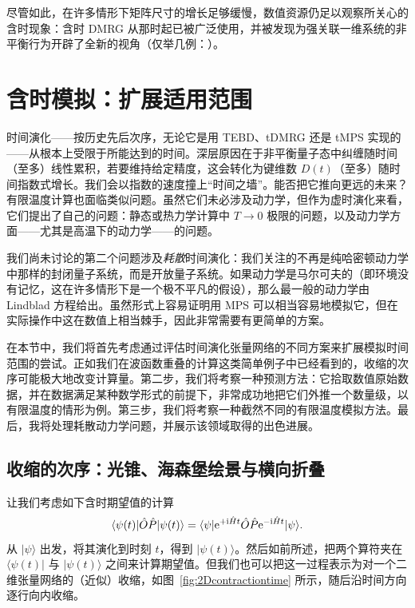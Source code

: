 \documentclass[a4paper,10pt,oneside,onecolumn,1p,times]{elsarticle}
\newcommand{\eul}{{\rm e }}
\newcommand{\imag}{{\rm i }}
\newcommand{\bra}[1]{\mbox{$\langle #1  |$}}
\newcommand{\ket}[1]{\mbox{$| #1  \rangle$}}
\begin{document}
尽管如此，在许多情形下矩阵尺寸的增长足够缓慢，数值资源仍足以观察所关心的含时现象：含时 DMRG 从那时起已被广泛使用，并被发现为强关联一维系统的非平衡行为开辟了全新的视角（仅举几例：\cite{WhiteFeiguin04,Feiguin05a,Feiguin05,Gobert05,Kollath05,Trebst06,Cramer08,Barthel09a,Kollath06}）。
 
\section{含时模拟：扩展适用范围}
\label{sec:beyondtime}

时间演化——按历史先后次序，无论它是用 TEBD、tDMRG 还是 tMPS 实现的——从根本上受限于所能达到的时间。深层原因在于非平衡量子态中纠缠随时间（至多）线性累积，若要维持给定精度，这会转化为键维数 $D(t)$（至多）随时间指数式增长。我们会以指数的速度撞上“时间之墙”。能否把它推向更远的未来？有限温度计算也面临类似问题。虽然它们未必涉及动力学，但作为虚时演化来看，它们提出了自己的问题：静态或热力学计算中 $T\rightarrow 0$ 极限的问题，以及动力学方面——尤其是高温下的动力学——的问题。

我们尚未讨论的第二个问题涉及{\em 耗散}时间演化：我们关注的不再是纯哈密顿动力学中那样的封闭量子系统，而是开放量子系统。如果动力学是马尔可夫的（即环境没有记忆，这在许多情形下是一个极不平凡的假设），那么最一般的动力学由 Lindblad 方程给出。虽然形式上容易证明用 MPS 可以相当容易地模拟它，但在实际操作中这在数值上相当棘手，因此非常需要有更简单的方案。 

在本节中，我们将首先考虑通过评估时间演化张量网络的不同方案来扩展模拟时间范围的尝试。正如我们在波函数重叠的计算这类简单例子中已经看到的，收缩的次序可能极大地改变计算量。第二步，我们将考察一种预测方法：它拾取数值原始数据，并在数据满足某种数学形式的前提下，非常成功地把它们外推一个数量级，以有限温度的情形为例。第三步，我们将考察一种截然不同的有限温度模拟方法。最后，我将处理耗散动力学问题，并展示该领域取得的出色进展。

\subsection{收缩的次序：光锥、海森堡绘景与横向折叠}
让我们考虑如下含时期望值的计算
\begin{equation}
\bra{\psi(t)} \hat{O} \hat{P} \ket{\psi(t)} = \bra{\psi} \eul^{+\imag\hat{H}t} \hat{O} \hat{P} \eul^{-\imag\hat{H}t} \ket{\psi} .
\end{equation}
从 $\ket{\psi}$ 出发，将其演化到时刻 $t$，得到 $\ket{\psi(t)}$。然后如前所述，把两个算符夹在 $ \bra{\psi(t)}$ 与 $\ket{\psi(t)}$ 之间来计算期望值。但我们也可以把这一过程表示为对一个二维张量网络的（近似）收缩，如图~\ref{fig:2Dcontractiontime} 所示，随后沿时间方向逐行向内收缩。
\end{document}
